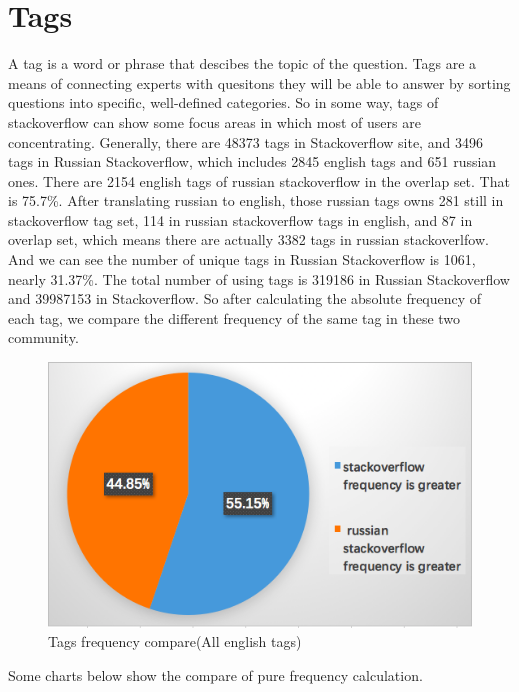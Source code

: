 \documentclass[A4paper,twoside,twocolumn]{article}
\begin{document}
\section{Tags}
A tag is a word or phrase that descibes the topic of the question. Tags are a means of connecting experts with quesitons they will be able to answer by sorting questions into specific, well-defined categories. So in some way, tags of stackoverflow can show some focus areas in which most of users are concentrating.
Generally, there are 48373 tags in Stackoverflow site, and 3496 tags in Russian Stackoverflow, which includes 2845 english tags and 651 russian ones.
There are 2154 english tags of russian stackoverflow in the overlap set. That is 75.7\%.
After translating russian to english, those russian tags owns 281  still in stackoverflow tag set, 114 in russian stackoverflow tags in english, and 87 in overlap set, which means there are actually 3382 tags in russian stackoverlfow. And we can see the number of unique tags in Russian Stackoverflow is 1061, nearly 31.37\%.
The total number of using tags is 319186 in Russian Stackoverflow and 39987153 in Stackoverflow. So after calculating the absolute frequency of each tag, we compare the different frequency of the same tag in these two community.
\begin{figure}[H]
		\includegraphics[width = 0.98\columnwidth]{tag_frequency.png}
		\caption{Tags frequency compare(All english tags)}
	\end{figure}

Some charts below show the compare of pure frequency calculation.
\end{document}
